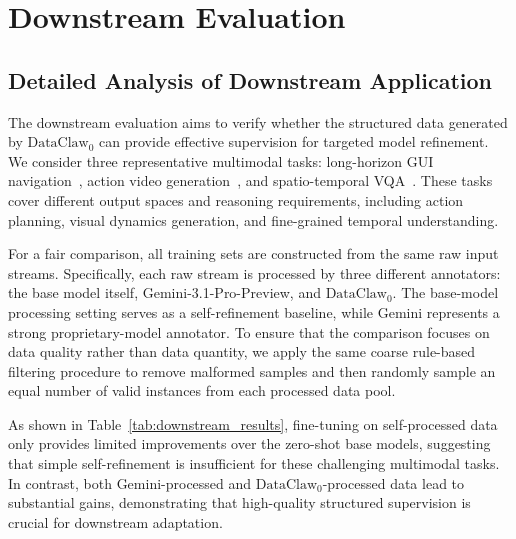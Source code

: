






\section{Downstream Evaluation}
\label{app:downstream_protocols}

\subsection{Detailed Analysis of Downstream Application}
\label{app:downstream}

The downstream evaluation aims to verify whether the structured data generated by $\text{DataClaw}_0$ can provide effective supervision for targeted model refinement. We consider three representative multimodal tasks: long-horizon GUI navigation~\cite{wang2025opencua}, action video generation~\cite{grauman2022ego4d}, and spatio-temporal VQA~\cite{remot}. These tasks cover different output spaces and reasoning requirements, including action planning, visual dynamics generation, and fine-grained temporal understanding.

For a fair comparison, all training sets are constructed from the same raw input streams. Specifically, each raw stream is processed by three different annotators: the base model itself, Gemini-3.1-Pro-Preview, and $\text{DataClaw}_0$. The base-model processing setting serves as a self-refinement baseline, while Gemini represents a strong proprietary-model annotator. To ensure that the comparison focuses on data quality rather than data quantity, we apply the same coarse rule-based filtering procedure to remove malformed samples and then randomly sample an equal number of valid instances from each processed data pool.

As shown in Table~\ref{tab:downstream_results}, fine-tuning on self-processed data only provides limited improvements over the zero-shot base models, suggesting that simple self-refinement is insufficient for these challenging multimodal tasks. In contrast, both Gemini-processed and $\text{DataClaw}_0$-processed data lead to substantial gains, demonstrating that high-quality structured supervision is crucial for downstream adaptation.

